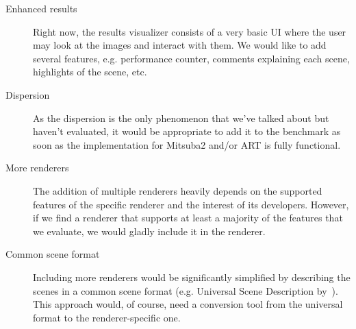 \begin{description}
	\item[Enhanced results] Right now, the results visualizer consists of a very basic UI where the user may look at the images and interact with them. We would like to add several features, e.g. performance counter, comments explaining each scene, highlights of the scene, etc.
	\item[Dispersion] As the dispersion is the only phenomenon that we've talked about but haven't evaluated, it would be appropriate to add it to the benchmark as soon as the implementation for Mitsuba2 and/or ART is fully functional.
	\item[More renderers] The addition of multiple renderers heavily depends on the supported features of the specific renderer and the interest of its developers. However, if we find a renderer that supports at least a majority of the features that we evaluate, we would gladly include it in the renderer.
	\item[Common scene format] Including more renderers would be significantly simplified by describing the scenes in a common scene format (e.g. Universal Scene Description by~\citet{usdDoc}). This approach would, of course, need a conversion tool from the universal format to the renderer-specific one.
\end{description}